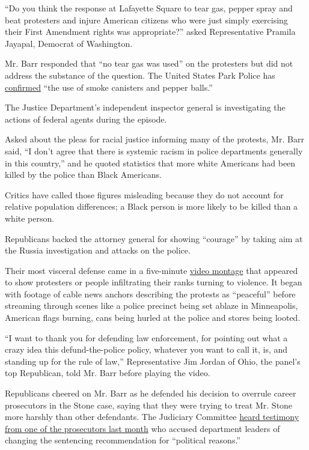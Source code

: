 ``Do you think the response at Lafayette Square to tear gas, pepper
spray and beat protesters and injure American citizens who were just
simply exercising their First Amendment rights was appropriate?'' asked
Representative Pramila Jayapal, Democrat of Washington.

Mr. Barr responded that ``no tear gas was used'' on the protesters but
did not address the substance of the question. The United States Park
Police has
\href{https://www.nps.gov/subjects/uspp/6_2_20_statement_from_acting_chief_monahan.htm}{confirmed}
``the use of smoke canisters and pepper balls.''

The Justice Department's independent inspector general is investigating
the actions of federal agents during the episode.

Asked about the pleas for racial justice informing many of the protests,
Mr. Barr said, ``I don't agree that there is systemic racism in police
departments generally in this country,'' and he quoted statistics that
more white Americans had been killed by the police than Black Americans.

Critics have called those figures misleading because they do not account
for relative population differences; a Black person is more likely to be
killed than a white person.

Republicans backed the attorney general for showing ``courage'' by
taking aim at the Russia investigation and attacks on the police.

Their most visceral defense came in a five-minute
\href{https://twitter.com/JudiciaryGOP/status/1288140402101555201}{video
montage} that appeared to show protesters or people infiltrating their
ranks turning to violence. It began with footage of cable news anchors
describing the protests as ``peaceful'' before streaming through scenes
like a police precinct being set ablaze in Minneapolis, American flags
burning, cans being hurled at the police and stores being looted.

``I want to thank you for defending law enforcement, for pointing out
what a crazy idea this defund-the-police policy, whatever you want to
call it, is, and standing up for the rule of law,'' Representative Jim
Jordan of Ohio, the panel's top Republican, told Mr. Barr before playing
the video.

Republicans cheered on Mr. Barr as he defended his decision to overrule
career prosecutors in the Stone case, saying that they were trying to
treat Mr. Stone more harshly than other defendants. The Judiciary
Committee
\href{https://www.nytimes3xbfgragh.onion/2020/06/23/us/politics/roger-stone-sentencing-politicized.html}{heard
testimony from one of the prosecutors last month} who accused department
leaders of changing the sentencing recommendation for ``political
reasons.''

